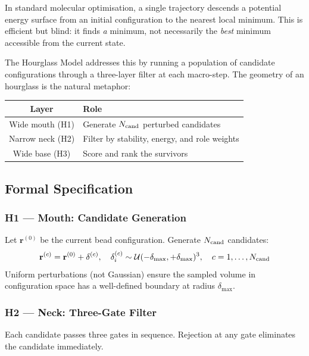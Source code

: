 \documentclass[11pt, a4paper, oneside]{article}
\theoremstyle{definition}
\begin{document}
In standard molecular optimisation, a single trajectory descends a
potential energy surface from an initial configuration to the nearest
local minimum.  This is efficient but blind: it finds \emph{a} minimum,
not necessarily the \emph{best} minimum accessible from the current state.

The Hourglass Model addresses this by running a population of candidate
configurations through a three-layer filter at each macro-step.  The
geometry of an hourglass is the natural metaphor:

\begin{center}
\begin{tabular}{cl}
\toprule
Layer & Role \\
\midrule
Wide mouth (H1) & Generate $N_{\rm cand}$ perturbed candidates \\
Narrow neck (H2) & Filter by stability, energy, and role weights \\
Wide base (H3) & Score and rank the survivors \\
\bottomrule
\end{tabular}
\end{center}

\subsection{Formal Specification}
\label{sec:hourglass-formal}

\subsubsection{H1 — Mouth: Candidate Generation}

Let $\mathbf{r}^{(0)}$ be the current bead configuration.
Generate $N_{\rm cand}$ candidates:
%
\begin{equation}
  \mathbf{r}^{(c)} = \mathbf{r}^{(0)} + \delta^{(c)},
  \quad \delta^{(c)}_i \sim \mathcal{U}(-\delta_{\max}, +\delta_{\max})^3,
  \quad c = 1,\ldots,N_{\rm cand}
  \label{eq:hg-mouth}
\end{equation}
%
Uniform perturbations (not Gaussian) ensure the sampled volume in
configuration space has a well-defined boundary at radius $\delta_{\max}$.

\subsubsection{H2 — Neck: Three-Gate Filter}

Each candidate passes three gates in sequence.  Rejection at any gate
eliminates the candidate immediately.
\end{document}
